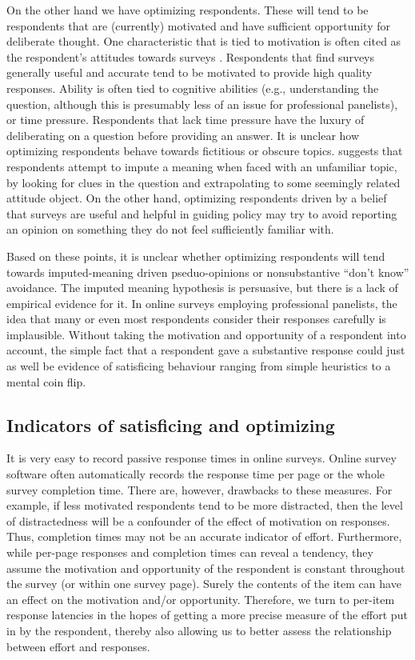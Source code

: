 \documentclass[Royal,times,sageh]{sagej}
\begin{document}
On the other hand we have optimizing respondents. These will tend to be
respondents that are (currently) motivated and have sufficient
opportunity for deliberate thought. One characteristic that is tied to
motivation is often cited as the respondent's attitudes towards surveys
\citep{Stocke2004a, Stocke2004c}. Respondents that find surveys
generally useful and accurate tend to be motivated to provide high
quality responses. Ability is often tied to cognitive abilities (e.g.,
understanding the question, although this is presumably less of an issue
for professional panelists), or time pressure. Respondents that lack
time pressure have the luxury of deliberating on a question before
providing an answer. It is unclear how optimizing respondents behave
towards fictitious or obscure topics. \citet{Sturgis2010} suggests that
respondents attempt to impute a meaning when faced with an unfamiliar
topic, by looking for clues in the question and extrapolating to some
seemingly related attitude object. On the other hand, optimizing
respondents driven by a belief that surveys are useful and helpful in
guiding policy may try to avoid reporting an opinion on something they
do not feel sufficiently familiar with.

Based on these points, it is unclear whether optimizing respondents will
tend towards imputed-meaning driven pseduo-opinions or nonsubstantive
``don't know'' avoidance. The imputed meaning hypothesis is persuasive,
but there is a lack of empirical evidence for it. In online surveys
employing professional panelists, the idea that many or even most
respondents consider their responses carefully is implausible. Without
taking the motivation and opportunity of a respondent into account, the
simple fact that a respondent gave a substantive response could just as
well be evidence of satisficing behaviour ranging from simple heuristics
to a mental coin flip.

\hypertarget{indicators-of-satisficing-and-optimizing}{%
\subsection{Indicators of satisficing and
optimizing}\label{indicators-of-satisficing-and-optimizing}}

It is very easy to record passive response times in online surveys.
Online survey software often automatically records the response time per
page or the whole survey completion time. There are, however, drawbacks
to these measures. For example, if less motivated respondents tend to be
more distracted, then the level of distractedness will be a confounder
of the effect of motivation on responses. Thus, completion times may not
be an accurate indicator of effort. Furthermore, while per-page
responses and completion times can reveal a tendency, they assume the
motivation and opportunity of the respondent is constant throughout the
survey (or within one survey page). Surely the contents of the item can
have an effect on the motivation and/or opportunity. Therefore, we turn
to per-item response latencies in the hopes of getting a more precise
measure of the effort put in by the respondent, thereby also allowing us
to better assess the relationship between effort and responses.
\end{document}
